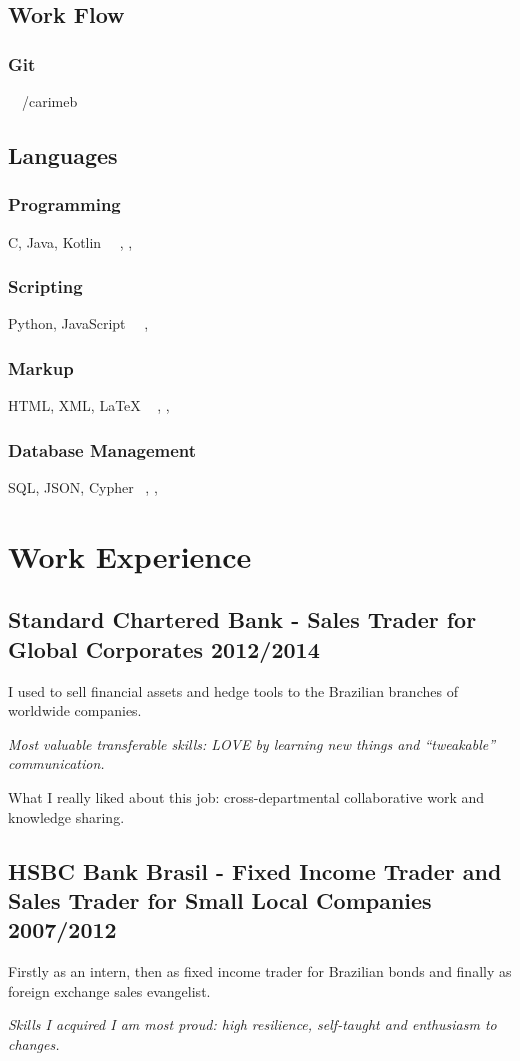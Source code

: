\documentclass{article}
\begin{document}
\subsection[]{Work Flow}
\subsubsection{Git}
\faGithub \  \ /carimeb

\subsection{Languages}
\subsubsection{Programming}
C, Java, Kotlin\   \    , ,  

\subsubsection{Scripting}
Python, JavaScript\   \    , 

\subsubsection{Markup}
HTML, XML, {\LaTeX}   \    , ,  

\subsubsection{Database Management}
SQL, JSON, Cypher   \   , , 

\section{Work Experience}
\subsection{Standard Chartered Bank - Sales Trader for Global Corporates \hfill 2012/2014}
I used to sell financial assets and hedge tools to the Brazilian branches of worldwide companies.

\emph{Most valuable transferable skills: LOVE by learning new things and ``tweakable'' communication.}

What I really liked about this job: cross-departmental collaborative work and knowledge sharing.

\subsection{HSBC Bank Brasil - Fixed Income Trader and Sales Trader for Small Local Companies \hfill 2007/2012}
Firstly as an intern, then as fixed income trader for Brazilian bonds and finally as foreign exchange sales evangelist.

\emph{Skills I acquired I am most proud: high resilience, self-taught and enthusiasm to changes.}
\end{document}
